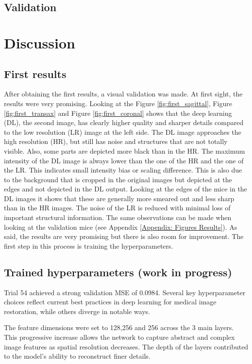 \documentclass[twocolumn]{article}
\begin{document}
\subsection{Validation}

\section{Discussion}
\subsection{First results}
After obtaining the first results, a visual validation was made. At first sight, the results were very promising. 
Looking at the Figure \ref{fig:first_sagittal}, Figure \ref{fig:first_transax} and Figure \ref{fig:first_coronal} shows that the deep learning (DL), the second image, has clearly higher quality and sharper details compared to the low resolution (LR) image at the left side. 
The DL image approaches the high resolution (HR), but still has noise and structures that are not totally visible. Also, some parts are depicted more black than in the HR.
The maximum intensity of the DL image is always lower than the one of the HR and the one of the LR. 
This indicates small intensity bias or scaling difference. This is also due to the background that is cropped in the original images but depicted at the edges and not depicted in the DL output. 
Looking at the edges of the mice in the DL images it shows that these are generally more smeared out and less sharp than in the HR images. 
The noise of the LR is reduced with minimal loss of important structural information. 
The same observations can be made when looking at the validation mice (see Appendix \ref{Appendix: Figures Results}).
As said, the results are very promising but there is also room for improvement. The first step in this process is training the hyperparameters. 

\subsection{Trained hyperparameters (work in progress)}
Trial 54 achieved a strong validation MSE of 0.0984. 
Several key hyperparameter choices reflect current best practices in deep learning for medical image restoration, while others diverge in notable ways. 

The feature dimensions were set to 128,256 and 256 across the 3 main layers. 
This progressive increase allows the network to capture abstract and complex image features as spatial resolution decreases. 
The depth of the layers contributed to the model's ability to reconstruct finer details.
\end{document}
